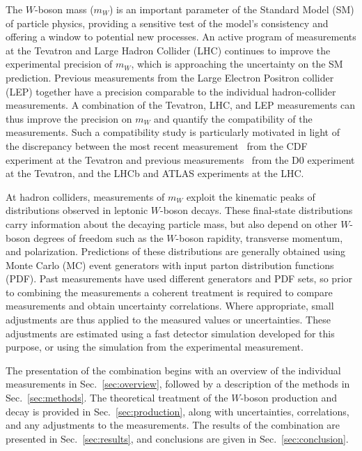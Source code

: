 
The $W$-boson mass ($m_W$) is an important parameter of the Standard Model (SM) of particle physics, providing a 
sensitive test of the model's consistency and offering a window to potential new processes.  An active program of
measurements at the Tevatron and Large Hadron Collider (LHC) continues to improve the experimental
precision of $m_W$, which is approaching the uncertainty on the SM prediction.  Previous measurements from the Large
Electron Positron collider (LEP) together have a precision comparable to the individual hadron-collider measurements.
A combination of the Tevatron, LHC, and LEP measurements can thus improve the precision on $m_W$ and quantify the
compatibility of the measurements.  Such a compatibility study is particularly motivated in light of the discrepancy
between the most recent measurement~\cite{CDF:2022hxs} from the CDF experiment at the Tevatron and previous
measurements~\cite{Abazov:2009cp,D0:2013jba,LHCb:2021bjt,Aaboud:2017svj} from the D0 experiment at the Tevatron,
and the LHCb and ATLAS experiments at the LHC. 

At hadron colliders, measurements of $m_W$ exploit the kinematic peaks of distributions observed in leptonic 
$W$-boson decays.  These final-state distributions carry information about the decaying particle mass, but also
depend on other $W$-boson degrees of freedom such as the $W$-boson rapidity, transverse momentum, and polarization.  
Predictions of these distributions are generally obtained using Monte Carlo (MC) event generators with input parton 
distribution functions (PDF).  Past measurements have used different generators and PDF sets, so prior to combining
the measurements a coherent treatment is required to compare measurements and obtain uncertainty correlations.  Where
appropriate, small adjustments are thus applied to the measured values or uncertainties.  These adjustments are
estimated using a fast detector simulation developed for this purpose, or using the simulation from the experimental
measurement.

The presentation of the combination begins with an overview of the individual measurements in Sec.~\ref{sec:overview}, 
followed by a description of the methods in Sec.~\ref{sec:methods}.  The theoretical treatment of the $W$-boson 
production and decay is provided in Sec.~\ref{sec:production}, along with uncertainties, correlations, and any 
adjustments to the measurements.  The results of the combination are presented in Sec.~\ref{sec:results}, and 
conclusions are given in Sec.~\ref{sec:conclusion}.

